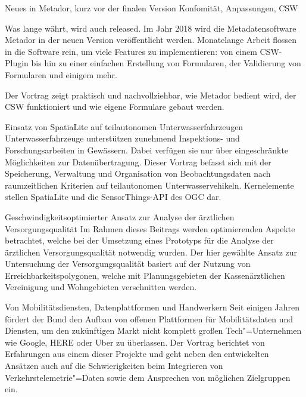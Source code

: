 \renewcommand{\conferenceDay}{\freitag}


\vspace{1\baselineskip}


\vspace{1\baselineskip}


\newpage
{}
%
{Neues in Metador, kurz vor der finalen Version\vspace{0.2em}}%
{Konfomität, Anpassungen, CSW}%
{%
Was lange währt, wird auch released. Im Jahr 2018 wird die Metadatensoftware Metador
in der neuen Version veröffentlicht werden. Monatelange Arbeit flossen in
die Software rein, um viele Features zu implementieren: von einem CSW-Plugin
bis hin zu einer einfachen Erstellung von Formularen, der Validierung von
Formularen und einigem mehr.

Der Vortrag zeigt praktisch und nachvollziehbar, wie Metador bedient wird,
der CSW funktioniert und wie eigene Formulare gebaut werden.%
}

%
{Einsatz von SpatiaLite auf teil\-autonomen Unterwasserfahrzeugen}%
{}%
{%
Unterwasserfahrzeuge unterstützen zunehmend Inspek\-tions- und Forschungsarbeiten
in Gewässern. Dabei verfügen sie nur über eingeschränkte Möglichkeiten zur
Datenübertragung. Dieser Vortrag befasst sich mit der Speicherung, Verwaltung
und Organisation von Beobachtungsdaten nach raumzeitlichen Kriterien auf
teilautonomen Unterwasservehikeln. Kernelemente stellen SpatiaLite und
die SensorThings-API des OGC dar.%
}

%
{Geschwindigkeitsoptimierter Ansatz zur Analyse der ärztlichen \mbox{Versorgungsqualität}}%
{}%
{%
Im Rahmen dieses Beitrags werden optimierenden Aspekte betrachtet, welche bei
der Umsetzung eines Prototyps für die Analyse der ärztlichen
Versorgungsqualität notwendig wurden. Der hier gewählte Ansatz zur Untersuchung
der Versorgungsqualität basiert auf der Nutzung von Erreichbarkeitspolygonen,
welche mit Planungsgebieten der Kassenärztlichen Vereinigung und Wohngebieten
verschnitten werden.%
}



%
{Von Mobilitätsdiensten, \mbox{Datenplattformen} und Handwerkern}%
{}%
{%
Seit einigen Jahren fördert der Bund den Aufbau von offenen Plattformen für
Mobilitätsdaten und Diensten, um den zukünftigen Markt nicht komplett großen
Tech"=Unternehmen wie Google, HERE oder Uber zu überlassen. Der Vortrag
berichtet von Erfahrungen aus einem dieser Projekte und geht neben den
entwickelten Ansätzen auch auf die Schwierigkeiten beim Integrieren von
Verkehrstelemetrie"=Daten sowie dem Ansprechen von möglichen Zielgruppen ein.%
}

